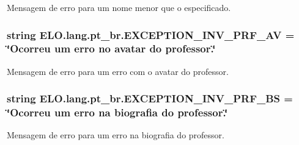 Mensagem de erro para um nome menor que o especificado. 

\hypertarget{namespaceELO_1_1lang_1_1pt__br_a715248b8b5f4866134fdab66594756fa}{
\subsubsection[{E\-X\-C\-E\-P\-T\-I\-O\-N\-\_\-\-I\-N\-V\-\_\-\-P\-R\-F\-\_\-\-A\-V}]{\setlength{\rightskip}{0pt plus 5cm}string E\-L\-O.\-lang.\-pt\-\_\-br.\-E\-X\-C\-E\-P\-T\-I\-O\-N\-\_\-\-I\-N\-V\-\_\-\-P\-R\-F\-\_\-\-A\-V = \char`\"{}Ocorreu um erro no avatar do professor.\char`\"{}}}\label{d5/d70/namespaceELO_1_1lang_1_1pt__br_a715248b8b5f4866134fdab66594756fa}


Mensagem de erro para um erro com o avatar do professor. 

\hypertarget{namespaceELO_1_1lang_1_1pt__br_affe6f924acc217d97dcbf77c664f8605}{
\subsubsection[{E\-X\-C\-E\-P\-T\-I\-O\-N\-\_\-\-I\-N\-V\-\_\-\-P\-R\-F\-\_\-\-B\-S}]{\setlength{\rightskip}{0pt plus 5cm}string E\-L\-O.\-lang.\-pt\-\_\-br.\-E\-X\-C\-E\-P\-T\-I\-O\-N\-\_\-\-I\-N\-V\-\_\-\-P\-R\-F\-\_\-\-B\-S = \char`\"{}Ocorreu um erro na biografia do professor.\char`\"{}}}\label{d5/d70/namespaceELO_1_1lang_1_1pt__br_affe6f924acc217d97dcbf77c664f8605}


Mensagem de erro para um erro na biografia do professor. 

